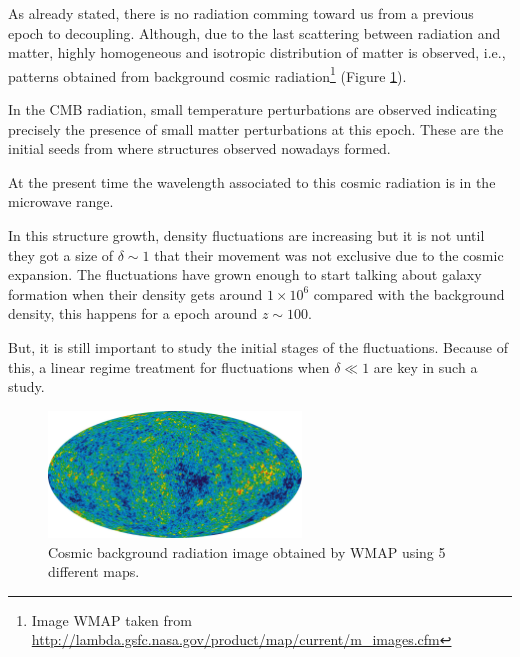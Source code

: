 As already stated, there is no radiation comming toward us from a previous 
epoch to decoupling. Although, due to the last scattering between radiation
and matter, highly homogeneous and isotropic distribution of matter is
observed, i.e., patterns obtained from background cosmic radiation\footnote{
Image WMAP taken from \url{http://lambda.gsfc.nasa.gov/product/map/current/m_images.cfm}} 
(Figure \ref{CMB}).  

In the CMB radiation, small temperature perturbations are observed indicating precisely 
the presence of small matter perturbations at this epoch. These are the initial 
seeds from where structures observed nowadays formed. 

At the present time the wavelength associated to this cosmic radiation is in the 
microwave range.

In this structure growth, density fluctuations are increasing but it is not
until they got a size of $\delta\sim 1$ that their movement was not exclusive
due to the cosmic expansion. The fluctuations have grown enough to start talking 
about galaxy formation when their density gets around $1\times 10^6$ compared with
the background density, this happens for a epoch around $z\sim 100$.

But, it is still important to study the initial stages of the fluctuations.
Because of this, a linear regime treatment for fluctuations when $\delta\ll 1$
are key in such a study. 

\begin{figure}[htbp]
       \centering
               \includegraphics[width=0.6\textwidth]{Images/chapter2/CMB.png}
       \caption{\small Cosmic background radiation image obtained by WMAP 
       using 5 different maps.}
       \label{CMB}
 \end{figure}


